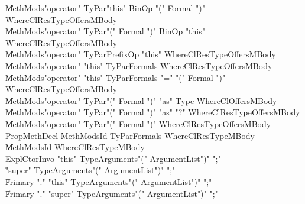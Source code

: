 {\begin{grammar}
    \| MethMods\opt \xcd"operator" TyPar\opt \xcd"this" BinOp \xcd"(" Formal  \xcd")" WhereCl\opt ResType\opt Offers\opt MBody\\
    \| MethMods\opt \xcd"operator" TyPar\opt \xcd"(" Formal  \xcd")" BinOp \xcd"this" WhereCl\opt ResType\opt Offers\opt MBody\\
    \| MethMods\opt \xcd"operator" TyPar\opt PrefixOp \xcd"this" WhereCl\opt ResType\opt Offers\opt MBody\\
    \| MethMods\opt \xcd"operator" \xcd"this" TyPar\opt Formals WhereCl\opt ResType\opt Offers\opt MBody\\
    \| MethMods\opt \xcd"operator" \xcd"this" TyPar\opt Formals \xcd"=" \xcd"(" Formal  \xcd")" WhereCl\opt ResType\opt Offers\opt MBody\\
    \| MethMods\opt \xcd"operator" TyPar\opt \xcd"(" Formal  \xcd")" \xcd"as" Type WhereCl\opt Offers\opt MBody\\
    \| MethMods\opt \xcd"operator" TyPar\opt \xcd"(" Formal  \xcd")" \xcd"as" \xcd"?" WhereCl\opt ResType\opt Offers\opt MBody\\
    \| MethMods\opt \xcd"operator" TyPar\opt \xcd"(" Formal  \xcd")" WhereCl\opt ResType\opt Offers\opt MBody\\
 PropMethDecl  \: MethMods\opt Id TyPar\opt Formals WhereCl\opt ResType\opt MBody\\
    \| MethMods\opt Id WhereCl\opt ResType\opt MBody\\
 ExplCtorInvo  \: \xcd"this" TypeArguments\opt \xcd"(" ArgumentList\opt \xcd")" \xcd";"\\
    \| \xcd"super" TypeArguments\opt \xcd"(" ArgumentList\opt \xcd")" \xcd";"\\
    \| Primary \xcd"." \xcd"this" TypeArguments\opt \xcd"(" ArgumentList\opt \xcd")" \xcd";"\\
    \| Primary \xcd"." \xcd"super" TypeArguments\opt \xcd"(" ArgumentList\opt \xcd")" \xcd";"\\
\end{grammar}

\begin{grammar}


\end{grammar}}
